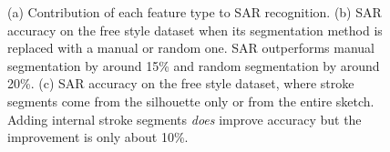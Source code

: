 \begin{figure}[htbp!]
\centering
{}
\vspace{-4mm}\caption{(a) Contribution of each feature type to SAR recognition. (b) SAR accuracy on the free style dataset when its segmentation method is replaced with a manual or random one. SAR outperforms manual segmentation by around 15\% and random segmentation by around 20\%. (c) SAR accuracy on the free style dataset, where stroke segments come from the silhouette only or from the entire sketch. Adding internal stroke segments \emph{does} improve accuracy but the improvement is only about 10\%.}\vspace{-4mm}
\end{figure}

